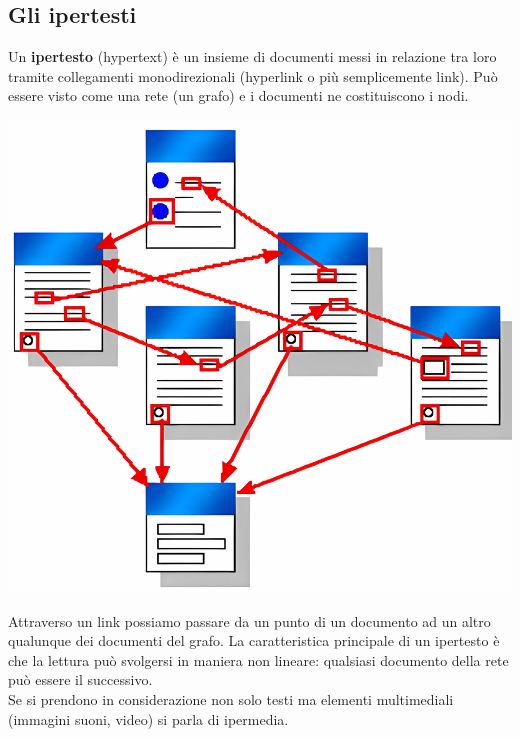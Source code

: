 \documentclass{article}
\begin{document}
\subsection{Gli ipertesti}
Un \textbf{ipertesto} (hypertext) è un insieme di documenti messi in relazione tra loro tramite collegamenti monodirezionali (hyperlink o più semplicemente link). Può essere visto come una rete (un
grafo) e i documenti ne costituiscono i nodi.
\begin{center}
    \includegraphics[scale=0.17]{Images/Ipertesto.png}
\end{center}
Attraverso un link possiamo passare da un
punto di un documento ad un altro qualunque dei documenti del grafo. La caratteristica principale di un ipertesto è che la lettura può svolgersi in maniera non lineare: qualsiasi documento della rete può essere il successivo.\\
Se si prendono in considerazione non solo testi ma elementi multimediali (immagini suoni, video) si parla di ipermedia.
\end{document}
